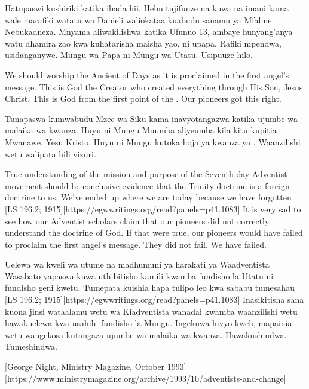 Hatupaswi kushiriki katika ibada hii. Hebu tujifunze na kuwa na imani kama wale marafiki watatu wa Danieli waliokataa kuabudu sanamu ya Mfalme Nebukadneza. Mnyama aliwakilishwa katika Ufunuo 13, ambaye hunyang'anya watu dhamira zao kwa kuhatarisha maisha yao, ni upapa. Rafiki mpendwa, usidanganywe. Mungu wa Papa ni Mungu wa Utatu. Usipuuze hilo.


We should worship the Ancient of Days as it is proclaimed in the first angel’s message. This is God the Creator who created everything through His Son, Jesus Christ. This is God from the first point of the . Our pioneers got this right.


Tunapaswa kumwabudu Mzee wa Siku kama inavyotangazwa katika ujumbe wa malaika wa kwanza. Huyu ni Mungu Muumba aliyeumba kila kitu kupitia Mwanawe, Yesu Kristo. Huyu ni Mungu kutoka hoja ya kwanza ya . Waanzilishi wetu walipata hili vizuri.


True understanding of the mission and purpose of the Seventh-day Adventist movement should be conclusive evidence that the Trinity doctrine is a foreign doctrine to us. We’ve ended up where we are today because we have forgotten [LS 196.2; 1915][https://egwwritings.org/read?panels=p41.1083] It is very sad to see how our Adventist scholars claim that our pioneers did not correctly understand the doctrine of God. If that were true, our pioneers would have failed to proclaim the first angel's message. They did not fail. We have failed.


Uelewa wa kweli wa utume na madhumuni ya harakati ya Waadventista Wasabato yapaswa kuwa uthibitisho kamili kwamba fundisho la Utatu ni fundisho geni kwetu. Tumepata kuishia hapa tulipo leo kwa sababu tumesahau [LS 196.2; 1915][https://egwwritings.org/read?panels=p41.1083] Inasikitisha sana kuona jinsi wataalamu wetu wa Kiadventista wanadai kwamba waanzilishi wetu hawakuelewa kwa usahihi fundisho la Mungu. Ingekuwa hivyo kweli, mapainia wetu wangekosa kutangaza ujumbe wa malaika wa kwanza. Hawakushindwa. Tumeshindwa.


[George Night, Ministry Magazine, October 1993][https://www.ministrymagazine.org/archive/1993/10/adventists-and-change]


